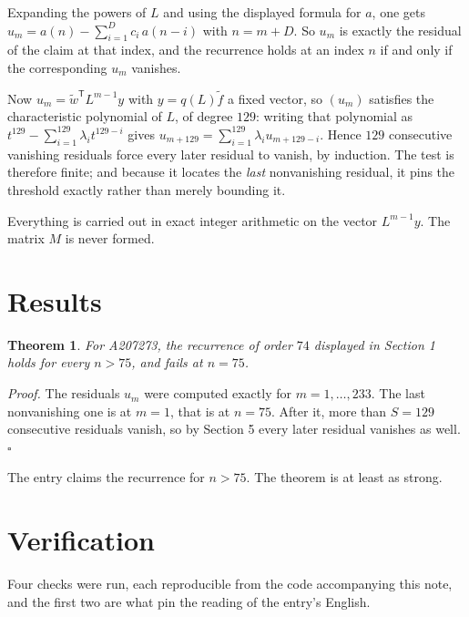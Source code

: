 \documentclass[11pt]{article}
\newtheorem{theorem}{Theorem}
\theoremstyle{definition}
\begin{document}
Expanding the powers of $L$ and using the displayed formula for $a$, one gets $u_m = a(n) - \sum_{i=1}^{D} c_i\,a(n-i)$ with $n = m + D$. So $u_m$ is exactly the residual of the claim at that index, and the recurrence holds at an index $n$ if and only if the corresponding $u_m$ vanishes.

Now $u_m = \tilde w^{\mathsf T} L^{m-1} y$ with $y = q(L)\tilde f$ a fixed vector, so $(u_m)$ satisfies the characteristic polynomial of $L$, of degree $129$: writing that polynomial as $t^{129} - \sum_{i=1}^{129} \lambda_i t^{129-i}$ gives $u_{m+129} = \sum_{i=1}^{129} \lambda_i u_{m+129-i}$. Hence $129$ consecutive vanishing residuals force every later residual to vanish, by induction. The test is therefore finite; and because it locates the {\itshape last} nonvanishing residual, it pins the threshold exactly rather than merely bounding it.

Everything is carried out in exact integer arithmetic on the vector $L^{m-1}y$. The matrix $M$ is never formed.

\section{Results}

\begin{theorem} For A207273, the recurrence of order $74$ displayed in Section 1 holds for every $n > 75$, and fails at $n = 75$.\end{theorem}

{\itshape Proof.} The residuals $u_m$ were computed exactly for $m = 1,\dots,233$. The last nonvanishing one is at $m = 1$, that is at $n = 75$. After it, more than $S = 129$ consecutive residuals vanish, so by Section 5 every later residual vanishes as well. $\square$

The entry claims the recurrence for $n > 75$. The theorem is at least as strong.

\section{Verification}

Four checks were run, each reproducible from the code accompanying this note, and the first two are what pin the reading of the entry's English.
\end{document}

